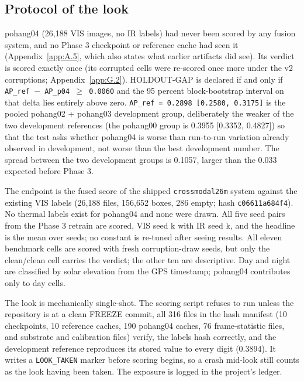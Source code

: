 \documentclass[10pt]{article}
\begin{document}
\subsection{Protocol of the look}\label{app:G.1}
pohang04 (26,188 VIS images, no IR labels) had never been scored by any fusion system, and no Phase 3 checkpoint or reference cache had seen it (Appendix~\ref{app:A.5}, which also states what earlier artifacts did see). Its verdict is scored exactly once (its corrupted cells were re-scored once more under the v2 corruptions; Appendix~\ref{app:G.2}). HOLDOUT-GAP is declared if and only if \texttt{AP\_\allowbreak{}ref $-$ AP\_\allowbreak{}p04 $\geq$ 0.0060} and the 95 percent block-bootstrap interval on that delta lies entirely above zero. \texttt{AP\_\allowbreak{}ref = 0.2898 [0.2580, 0.3175]} is the pooled pohang02 + pohang03 development group, deliberately the weaker of the two development references (the pohang00 group is 0.3955 [0.3352, 0.4827]) so that the test asks whether pohang04 is worse than run-to-run variation already observed in development, not worse than the best development number. The spread between the two development groups is 0.1057, larger than the 0.033 expected before Phase 3.

The endpoint is the fused score of the shipped \texttt{crossmodal26m} system against the existing VIS labels (26,188 files, 156,652 boxes, 286 empty; hash \texttt{c06611a684f4}). No thermal labels exist for pohang04 and none were drawn. All five seed pairs from the Phase 3 retrain are scored, VIS seed k with IR seed k, and the headline is the mean over seeds; no constant is re-tuned after seeing results. All eleven benchmark cells are scored with fresh corruption-draw seeds, but only the clean/clean cell carries the verdict; the other ten are descriptive. Day and night are classified by solar elevation from the GPS timestamp; pohang04 contributes only to day cells.

The look is mechanically single-shot. The scoring script refuses to run unless the repository is at a clean FREEZE commit, all 316 files in the hash manifest (10 checkpoints, 10 reference caches, 190 pohang04 caches, 76 frame-statistic files, and substrate and calibration files) verify, the labels hash correctly, and the development reference reproduces its stored value to every digit (0.3894). It writes a \texttt{LOOK\_\allowbreak{}TAKEN} marker before scoring begins, so a crash mid-look still counts as the look having been taken. The exposure is logged in the project's ledger.
\end{document}
